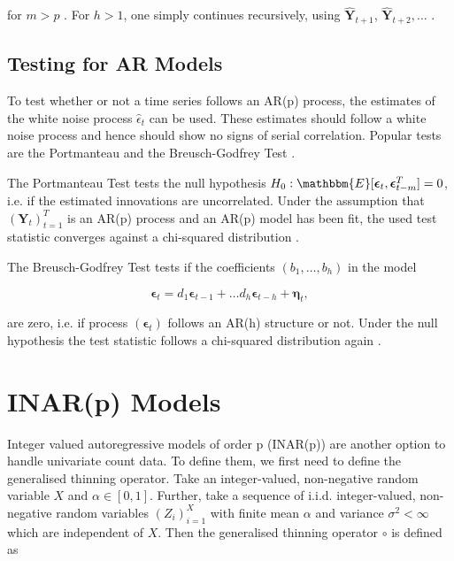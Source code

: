 for $m>p$ \cite{Scherrer:2021}. For $h>1$, one simply continues recursively, using $\hat{\bm{Y}}_{t+1}$, $\hat{\bm{Y}}_{t+2},\ldots$ .

\subsection{Testing for AR Models}
\label{sec: Testing for ar models}

To test whether or not a time series follows an AR(p) process, the estimates of the white noise process $\hat{\epsilon}_t$ can be used. These estimates should follow a white noise process and hence should show no signs of serial correlation. Popular tests are the Portmanteau and the Breusch-Godfrey Test \cite{Scherrer:2021}. 

The Portmanteau Test tests the null hypothesis $H_0: \mathbbm{E}[\bm{\epsilon}_t,\bm{\epsilon}_{t-m}^T]=0$, i.e. if the estimated innovations are uncorrelated. Under the assumption that $(\bm{Y}_t)_{t=1}^T$ is an AR(p) process and an AR(p) model has been fit, the used test statistic converges against a chi-squared distribution \cite{Scherrer:2021}. 

The Breusch-Godfrey Test tests if the coefficients $(b_1,\ldots,b_h)$ in the model 

\begin{equation}
\bm{\epsilon}_t = d_1\bm{\epsilon}_{t-1} +\ldots d_h \bm{\epsilon}_{t-h} + \bm{\eta}_t,
\label{eq:Breusch-Godfrey Test model}
\end{equation}

are zero, i.e. if process $(\bm{\epsilon}_t)$ follows an AR(h) structure or not. Under the null hypothesis the test statistic follows a chi-squared distribution again \cite{Scherrer:2021}. 

\section{INAR(p) Models}
\label{sec: Inar Models}

Integer valued autoregressive models of order p (INAR(p)) are another option to handle univariate count data. To define them, we first need to define the generalised thinning operator. Take an integer-valued, non-negative random variable $X$ and $\alpha \in [0,1]$. Further, take a sequence of i.i.d. integer-valued, non-negative random variables $(Z_i)_{i=1}^X$ with finite mean $\alpha$ and variance $\sigma^2<\infty $ which are independent of $X$. Then the generalised thinning operator $\circ$ is defined as

